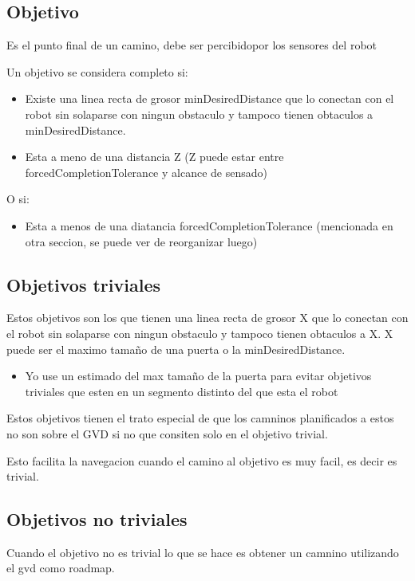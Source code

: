 \subsection{Objetivo}
Es el punto final de un camino, debe ser percibidopor los sensores del robot

Un objetivo se considera completo si:
\begin{itemize}
  \item Existe una linea recta de grosor minDesiredDistance que lo conectan con el
    robot sin solaparse con ningun obstaculo y tampoco tienen obtaculos a minDesiredDistance. 
  \item Esta a meno de una distancia Z (Z puede estar entre forcedCompletionTolerance y alcance de sensado)
\end{itemize}

O si:
\begin{itemize}
  \item Esta a menos de una diatancia forcedCompletionTolerance (mencionada en otra seccion, se puede ver de reorganizar luego)
\end{itemize}

\subsection{Objetivos triviales}
Estos objetivos son los que tienen una linea recta de grosor X que lo conectan
con el robot sin solaparse con ningun obstaculo y tampoco tienen obtaculos a
X. X puede ser el maximo tamaño de una puerta o la minDesiredDistance.
\begin{itemize}
  \item Yo use un estimado del max tamaño de la puerta para evitar objetivos
    triviales  que esten en un segmento distinto del que esta el robot
\end{itemize}

Estos objetivos tienen el trato especial de que los camninos planificados a
estos no son sobre el GVD si no que consiten solo en el objetivo trivial.

Esto facilita la navegacion cuando el camino al objetivo es muy facil, es decir es trivial.

\subsection{Objetivos no triviales}

Cuando el objetivo no es trivial lo que se hace es obtener un camnino utilizando el
gvd como roadmap.

